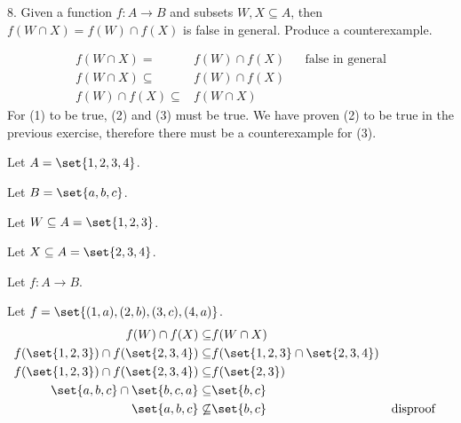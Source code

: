 \documentclass{hippoidC}
\begin{document}
\begin{prooflist}{8. Given a function $f: A \rightarrow B$ and subsets $W, X \subseteq A$, then $f(W \cap X)=f(W) \cap f(X)$ is false in general. Produce a counterexample.}
	\item \imagedef{}
	\begin{align}
		f(W \cap X)=             & f(W) \cap f(X) &  & \text{false in general} \\
		f(W \cap X)\subseteq     & f(W) \cap f(X)                              \\
		f(W) \cap f(X) \subseteq & f(W \cap X)
	\end{align}
	For (1) to be true, (2) and (3) must be true. We have proven (2) to be true in
	the previous exercise, therefore there must be a counterexample for (3).
	\item Let $A=\set{1, 2, 3, 4}$.
	\item Let $B=\set{a, b, c}$.
	\item Let $W\subseteq A = \set{1, 2, 3}$.
	\item Let $X\subseteq A = \set{2, 3, 4}$.
	\item Let $f: A \rightarrow B$.
	\item Let $f = \set{(1, a), (2, b), (3, c), (4, a)}$.
	\begin{align}
		f(W) \cap f(X) \subseteq                         & f(W \cap X)                                              \\
		f(\set{1, 2, 3}) \cap f(\set{2, 3, 4}) \subseteq & f(\set{1, 2, 3} \cap \set{2, 3, 4})                      \\
		f(\set{1, 2, 3}) \cap f(\set{2, 3, 4}) \subseteq & f(\set{2, 3})                                            \\
		\set{a, b, c} \cap \set{b, c, a} \subseteq       & \set{b, c}                                               \\
		\set{a, b, c} \not\subseteq                      & \set{b, c}                          &  & \text{disproof}
	\end{align}
\end{prooflist}
\end{document}

